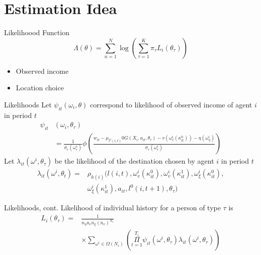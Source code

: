\documentclass[aspectratio=169,professionalfonts]{beamer}
\begin{document}
\section{Estimation Idea}

\begin{frame}{Likelihoood Function}
  \begin{equation}
    \Lambda(\theta) = \sum\limits_{n=1}^N\log(\sum\limits_{\tau=1}^K\pi_{\tau}L_i(\theta_{\tau}))
  \end{equation}
  \begin{itemize}
    \item Observed income
    \item Location choice
  \end{itemize}
\end{frame}

\begin{frame}{Likelihoods}
  Let $\psi_{it}(\omega_i, \theta)$ correspond to likelihood of observed income of agent $i$ in period $t$
  \begin{equation}
    \begin{split}
      \psi_{it} &(\omega_i,\theta_{\tau})  \\
      &=\frac{1}{\sigma_{\epsilon}(\omega_{\epsilon}^i)}\phi(\frac{w_{it} - \mu_{l^0(i,t)} 0 G(X_i, a_{it},\theta_{\tau}) - v(\omega_v^i(\kappa_{it}^0)) - \eta(\omega_{\eta}^i)}{\sigma_{\epsilon}(\omega_{\epsilon}^i)})
    \end{split}
  \end{equation}
  Let $\lambda_{it}(\omega^i, \theta_{\tau})$ be the likelihood of the destination chosen by agent $i$ in period $t$
  \begin{equation}
    \begin{split}
      \lambda_{it}(\omega^i, \theta_t) =& \rho_{h(i)}(l(i,t), \omega_v^i(\kappa_{it}^0), \omega_v^i(\kappa_{it}^1), \omega_{\xi}^i(\kappa_{it}^0), \\
                   & \omega_{\xi}^i(\kappa_{it}^1), a_{it}, l^0(i, t+1), \theta_{\tau})
    \end{split}
  \end{equation}
\end{frame}

\begin{frame}{Likelihoods, cont.}
  Likelihood of individual history for a person of type $\tau$ is
  \begin{equation}
    \begin{split}
      L_i(\theta_{\tau}) = &\frac{1}{n_{\eta}n_{\epsilon}n_{\xi}(n_v)^{N_i}} \\
      & \times \sum\limits_{\omega^i\in\Omega(N_i)}(\Pi\limits_{t=1}^{T_i}\psi_{it}(\omega^i,\theta_{\tau})\lambda_{it}(\omega^i,\theta_{\tau}))
    \end{split}
  \end{equation}
\end{frame}
\end{document}
